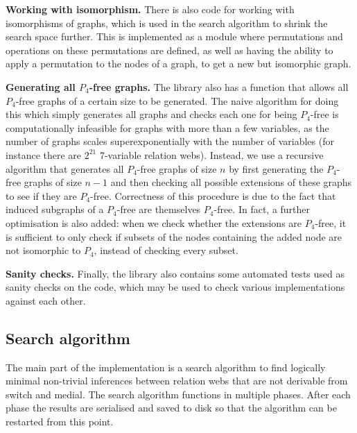 \documentclass[a4paper, UKenglish, cleveref]{lipics-v2021}
\begin{document}
\smallskip

\textbf{Working with isomorphism.}
There is also code for working with isomorphisms of graphs, which is used in the search algorithm to shrink the search space further. This is implemented as a module where permutations and operations on these permutations are defined, as well as having the ability to apply a permutation to the nodes of a graph, to get a new but isomorphic graph.

\smallskip

\textbf{Generating all $P_4$-free graphs.}
The library also has a function that allows all \(P_4\)-free graphs of a certain size to be generated. The naive algorithm for doing this which simply generates all graphs and checks each one for being \(P_4\)-free is computationally infeasible for graphs with more than a few variables, as the number of graphs scales superexponentially with the number of variables (for instance there are \(2^{21}\) 7-variable relation webs).
Instead, we use a recursive algorithm that generates all \(P_4\)-free graphs of size \(n\) by first generating the \(P_4\)-free graphs of size \(n-1\) and then checking all possible extensions of these graphs to see if they are \(P_4\)-free. Correctness of this procedure is due to the fact that induced subgraphs of a \(P_4\)-free are themselves \(P_4\)-free. 
In fact, a further optimisation is also added: when we check whether the extensions are \(P_4\)-free, it is sufficient to only check if subsets of the nodes containing the added node are not isomorphic to \(P_4\), instead of checking every subset.

\smallskip

\textbf{Sanity checks.}
Finally, the library also contains some automated tests used as sanity checks on the code, which may be used to check various implementations against each other.

\subsection{Search algorithm}
\label{sec:search}

The main part of the implementation is a search algorithm to find logically minimal non-trivial inferences between relation webs that are not derivable from switch and medial. The search algorithm functions in multiple phases. After each phase the results are serialised and saved to disk so that the algorithm can be restarted from this point.

\smallskip
\end{document}

